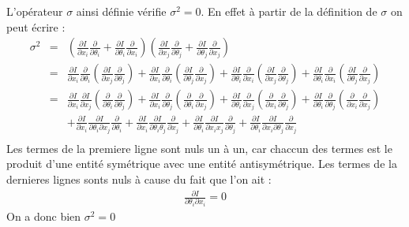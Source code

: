 \documentclass[a4paper,11pt]{article} %
\theoremstyle{plain}
\theoremstyle{definition}
\theoremstyle{remark}
\numberwithin{equation}{section}
\numberwithin{equation}{subsection}
\numberwithin{figure}{section}
\begin{document}
\noindent
L'opérateur $\sigma$ ainsi définie vérifie $\sigma^{2}=0$. En effet à partir de la définition de $\sigma$ on peut écrire :
\begin{eqnarray*}
 \sigma^2 &=& \left( \frac{\partial I}{\partial x_{i}} \frac{\partial}{\partial \theta_{i}} + 
\frac{\partial I}{\partial \theta_{i}} \frac{\partial}{\partial x_{i}} \right)
\left( \frac{\partial I}{\partial x_{j}} \frac{\partial}{\partial \theta_{j}}  + 
\frac{\partial I}{\partial \theta_{j}} \frac{\partial}{\partial x_{j}} \right)\\
          &=& \frac{\partial I}{\partial x_{i}} \frac{\partial}{\partial \theta_{i}} 
\left( \frac{\partial I}{\partial x_{j}} \frac{\partial}{\partial \theta_{j}} \right) 
    + \frac{\partial I}{\partial x_{i}} \frac{\partial}{\partial \theta_{i}} 
\left( \frac{\partial I}{\partial \theta_{j}} \frac{\partial}{\partial x_{j}} \right)
    + \frac{\partial I}{\partial \theta_{i}} \frac{\partial}{\partial x_{i}} 
\left( \frac{\partial I}{\partial x_{j}} \frac{\partial}{\partial \theta_{j}} \right)
    + \frac{\partial I}{\partial \theta_{i}} \frac{\partial}{\partial x_{i}} 
\left( \frac{\partial I}{\partial \theta_{j}} \frac{\partial}{\partial x_{j}} \right)\\
          &=& \frac{\partial I}{\partial x_{i}} \frac{\partial I}{\partial x_{j}}  
\left( \frac{\partial }{\partial \theta_{i}} \frac{\partial}{\partial \theta_{j}} \right)  
    + \frac{\partial I}{\partial x_{i}} \frac{\partial}{\partial \theta_{j}} 
\left( \frac{\partial }{\partial \theta_{i}} \frac{\partial}{\partial x_{j}} \right)
    + \frac{\partial I}{\partial \theta_{i}} \frac{\partial}{\partial x_{j}} 
\left( \frac{\partial }{\partial x_{i}} \frac{\partial}{\partial \theta_{j}} \right)
    + \frac{\partial I}{\partial \theta_{i}} \frac{\partial}{\partial \theta_{j}} 
\left( \frac{\partial }{\partial x_{i}} \frac{\partial}{\partial x_{j}} \right)\\
    && + \frac{\partial I}{\partial x_{i}} \frac{\partial I}{\partial \theta_{i} \partial x_{j}} 
\frac{\partial}{\partial \theta_{i}}
    + \frac{\partial I}{\partial x_{i}} \frac{\partial I}{\partial \theta_{i} \theta_{j}}
\frac{\partial}{\partial x_{j}}
    + \frac{\partial I}{\partial \theta_{i}} \frac{\partial I}{\partial x_{i} x_{j}}
\frac{\partial}{\partial \theta_{j}}
    + \frac{\partial I}{\partial \theta_{i}} \frac{\partial I}{\partial x_{i} \partial \theta_{j}}
\frac{\partial}{\partial x_{j}} \\
\end{eqnarray*}
Les termes de la premiere ligne sont nuls un à un, car chaccun des termes est le produit d'une entité symétrique avec une entité antisymétrique.
Les termes de la dernieres lignes sonts nuls à cause du fait que l'on ait : 
\begin{eqnarray*}
 \frac{\partial I}{\partial \theta_{i} \partial x_{i}} = 0
\end{eqnarray*}
On a donc bien $\sigma^{2}=0$\\
\end{document}
